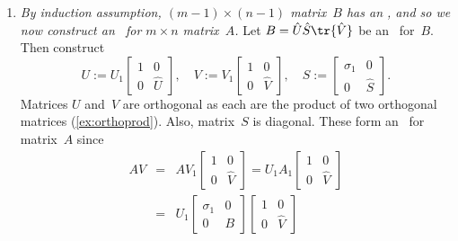 \begin{enumerate}
\item \emph{By induction assumption, \((m-1)\times(n-1)\) matrix~\(B\) has an \svd, and so we now construct an \svd\ for \(m\times n\) matrix~\(A\).}
Let \(B=\hat U\hat S\tr{\hat V}\) be an \svd\ for~\(B\).
Then construct 
\begin{equation*}
U:=U_1\begin{bmatrix} 1&0\\0&\hat U \end{bmatrix},\quad
V:=V_1\begin{bmatrix} 1&0\\0&\hat V\end{bmatrix},\quad
S:=\begin{bmatrix} \sigma_1&0\\0&\hat S \end{bmatrix}.
\end{equation*}
Matrices \(U\) and~\(V\) are orthogonal as each are the product of two orthogonal matrices (\autoref{ex:orthoprod}).
Also, matrix~\(S\) is diagonal.
These form an \svd\ for matrix~\(A\) since
\begin{eqnarray*}
AV&=&AV_1\begin{bmatrix} 1&0\\0&\hat V\end{bmatrix}
=U_1A_1\begin{bmatrix} 1&0\\0&\hat V\end{bmatrix}
\\&=&U_1\begin{bmatrix} \sigma_1&0 \\0&B \end{bmatrix}\begin{bmatrix} 1&0\\0&\hat V\end{bmatrix}

\end{eqnarray*}
\end{enumerate}
